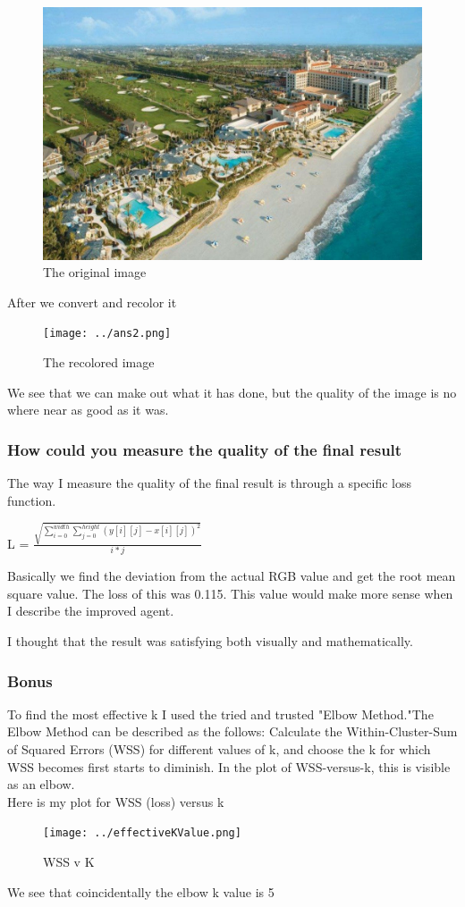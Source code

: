 \documentclass[12pt]{article} %
\begin{document}
\begin{figure}[H]
\centering
\includegraphics[width=160mm]{../data.png}
\caption{The original image \label{overflow}}
\end{figure}
After we convert and recolor it
\begin{figure}[H]
\centering
\texttt{[image: ../ans2.png]}
\caption{The recolored image \label{overflow}}
\end{figure}
We see that we can make out what it has done, but the quality of the image is no where near as good as it was. 

\subsubsection{How could you measure the quality of the final result}
The way I measure the quality of the final result is through a specific loss function. 
\begin{center}
L = $\frac{\sqrt{\sum_{i = 0}^{width} \sum_{j=0}^{height}(y[i][j] - x[i][j])^2}}{i*j}$
\end{center}
Basically we find the deviation from the actual RGB value and get the root mean square value. The loss of this was 0.115. This value would make more sense when I describe the improved agent. 

I thought that the result was satisfying both visually and mathematically. 

\subsubsection{Bonus}
To find the most effective k I used the tried and trusted "Elbow Method."The Elbow Method can be described as the follows: Calculate the Within-Cluster-Sum of Squared Errors (WSS) for different values of k, and choose the k for which WSS becomes first starts to diminish. In the plot of WSS-versus-k, this is visible as an elbow.\\
Here is my plot for WSS (loss) versus k
\begin{figure}[H]
\centering
\texttt{[image: ../effectiveKValue.png]}
\caption{WSS v K\label{overflow}}
\end{figure}
We see that coincidentally the elbow k value is 5
\pagebreak
\end{document}
